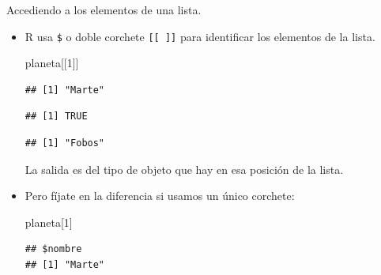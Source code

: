 \documentclass[
  9pt,
  ignorenonframetext,
]{beamer}
\newenvironment{Shaded}{\begin{snugshade}}{\end{snugshade}}
\newcommand{\DecValTok}[1]{\textcolor[rgb]{0.00,0.00,0.81}{#1}}
\newcommand{\NormalTok}[1]{#1}
\newcommand{\OperatorTok}[1]{\textcolor[rgb]{0.81,0.36,0.00}{\textbf{#1}}}
\begin{document}
\begin{frame}[fragile]{Accediendo a los elementos de una lista.}
\protect\hypertarget{accediendo-a-los-elementos-de-una-lista.}{}

\begin{itemize}
\item
  R usa \texttt{\$} o doble corchete \texttt{{[}{[}\ {]}{]}} para
  identificar los elementos de la lista.\small

\begin{Shaded}
\begin{Highlighting}[]
\NormalTok{planeta[[}\DecValTok{1}\NormalTok{]]}
\end{Highlighting}
\end{Shaded}

\begin{verbatim}
## [1] "Marte"
\end{verbatim}

\begin{Shaded}
\end{Shaded}

\begin{verbatim}
## [1] TRUE
\end{verbatim}

\begin{Shaded}
\end{Shaded}

\begin{verbatim}
## [1] "Fobos"
\end{verbatim}

  \normalsize La salida es del tipo de objeto que hay en esa posición de
  la lista.
\item
  Pero fíjate en la diferencia si usamos un único corchete:\small

\begin{Shaded}
\begin{Highlighting}[]
\NormalTok{planeta[}\DecValTok{1}\NormalTok{]}
\end{Highlighting}
\end{Shaded}

\begin{verbatim}
## $nombre
## [1] "Marte"
\end{verbatim}


\end{itemize}
\end{frame}
\end{document}
